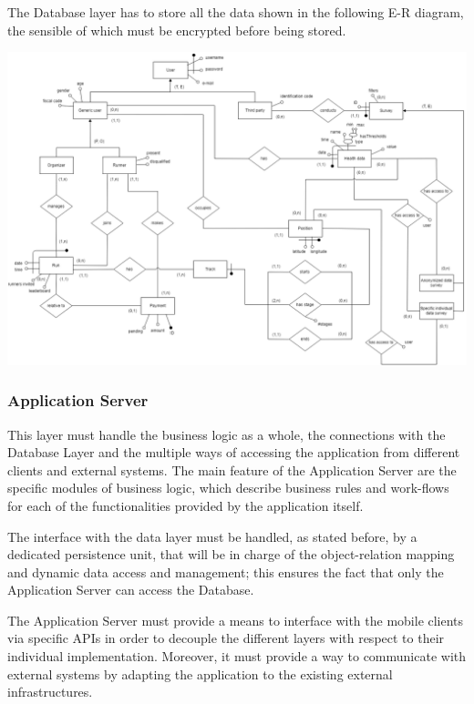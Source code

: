 The Database layer has to store all the data shown in the following E-R diagram, the sensible of which must be encrypted before being stored.

\begin{center}
\includegraphics[scale=0.33]{sections/diagrams/ER.png}
\newline
{}
\end{center}

\subsubsection{Application Server}
This layer must handle the business logic as a whole, the connections with the Database Layer and the multiple ways of accessing the application from different clients and external systems. The main feature of the Application Server are the specific modules of business logic, which describe business rules and work-flows for each of the functionalities provided by the application itself. \newline

The interface with the data layer must be handled, as stated before, by a dedicated persistence unit, that will be in charge of the object-relation mapping and dynamic data access and management; this ensures the fact that only the Application Server can access the Database. \newline

The Application Server must provide a means to interface with the mobile clients via specific APIs in order to decouple the different layers with respect to their individual implementation. Moreover, it must provide a way to communicate with external systems by adapting the application to the existing external infrastructures. \newline


